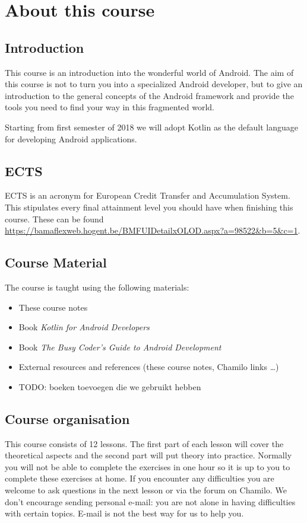 \chapter{About this course}

\section{Introduction}
This course is an introduction into the wonderful world of Android.
The aim of this course is not to turn you into a specialized Android developer, but to give an introduction to the general concepts of the Android framework and provide the tools you need to find your way in this fragmented world. 

Starting from first semester of 2018 we will adopt Kotlin as the default language for developing Android applications. 

\section{ECTS}
ECTS is an acronym for European Credit Transfer and Accumulation System.
This stipulates every final attainment level you should have when finishing this course.
These can be found \href{here}{https://bamaflexweb.hogent.be/BMFUIDetailxOLOD.aspx?a=98522\&b=5\&c=1}. 

\section{Course Material}
The course is taught using the following materials:

\begin{itemize}
	\item These course notes
	\item Book \textit{Kotlin for Android Developers} \cite{Leiva2018}
	\item Book  \textit{The Busy Coder's Guide to Android Development} \cite{murphymarkl.2017}
	\item External resources and references (these course notes, Chamilo links \dots)
	\item TODO: boeken toevoegen die we gebruikt hebben
\end{itemize}

\section{Course organisation}
This course consists of 12 lessons.
The first part of each lesson will cover the theoretical aspects and the second part will put theory into practice.
Normally you will not be able to complete the exercises in one hour so it is up to you to complete these exercises at home.
If you encounter any difficulties  you are welcome to ask questions in the next lesson or via the forum on Chamilo.
We don't encourage sending personal e-mail: you are not alone in having difficulties with certain topics.
E-mail is not the best way for us to help you.

